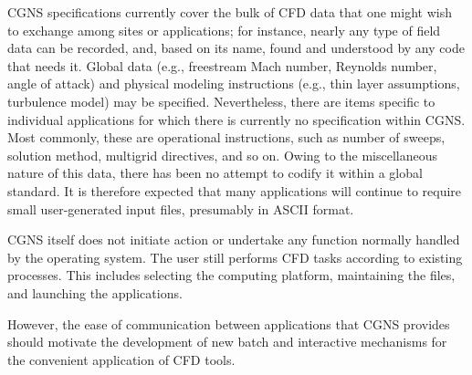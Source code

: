 CGNS specifications currently cover the bulk of CFD data that one might
wish to exchange among sites or applications; for instance, nearly any
type of field data can be recorded, and, based on its name, found and
understood by any code that needs it.
Global data (e.g., freestream Mach number, Reynolds number, angle
of attack) and physical modeling instructions (e.g., thin layer
assumptions, turbulence model) may be specified.
Nevertheless, there are items specific to individual applications for
which there is currently no specification within CGNS.
Most commonly, these are operational instructions, such as number of
sweeps, solution method, multigrid directives, and so on.
Owing to the miscellaneous nature of this data, there has been no
attempt to codify it within a global standard.
It is therefore expected that many applications will continue to require
small user-generated input files, presumably in ASCII format.

CGNS itself does not initiate action or undertake any function normally
handled by the operating system.
The user still performs CFD tasks according to existing processes.
This includes selecting the computing platform, maintaining the files,
and launching the applications.

However, the ease of communication between applications that CGNS
provides should motivate the development of new batch and interactive
mechanisms for the convenient application of CFD tools.
